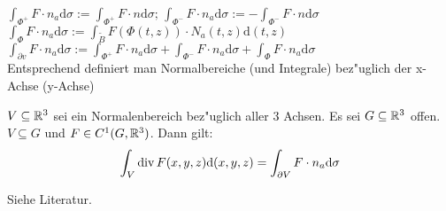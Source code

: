 \documentclass{article}
\begin{document}
\begin{definition}
$\int_{\Phi^+} F \cdot n_a \mathrm{d}\sigma := \int_{\Phi^+} F \cdot n
\mathrm{d}\sigma; \, \int_{\Phi^-} F \cdot n_a \mathrm{d}\sigma :=
-\int_{\Phi^-} F \cdot n \mathrm{d}\sigma$\\
$\int_{\Phi} F \cdot n_a \mathrm{d}\sigma := \int_{\tilde{B}} F (\Phi(t,z))
\cdot N_a (t,z) \mathrm{d}(t,z)$\\
$\int_{\partial v} F \cdot n_a \mathrm{d}\sigma := \int_{\Phi^+} F \cdot n_a
\mathrm{d}\sigma + \int_{\Phi^-} F \cdot n_a \mathrm{d}\sigma + \int_{\Phi} F
\cdot n_a \mathrm{d}\sigma$\\
Entsprechend definiert man Normalbereiche (und Integrale) bez"uglich der
x-Achse (y-Achse)\\
\end{definition}

\begin{satz}
$V \subseteq \mathbb{R}^3$ sei ein Normalenbereich bez"uglich aller 3 Achsen. Es
sei $G \subseteq \mathbb{R}^3$ offen. $V \subseteq G$ und $F \in C^1(G, \mathbb{R}^3)$.
Dann gilt:
\[
\int_V \mathop{\rm div}\nolimits F(x,y,z) \mathrm{d}(x,y,z) = \int_{\partial V} F \cdot n_a
\mathrm{d}\sigma
\]
\end{satz}

\begin{beweis}
Siehe Literatur.
\end{beweis}
\end{document}
